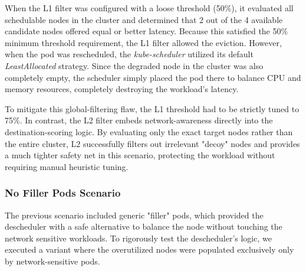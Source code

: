 \begin{table}[H]
    \centering
    \caption{Impact of MinBetterPercentage on L1 Pre-Eviction Filters}
    \label{tab:minbetter_impact}
\end{table}

When the L1 filter was configured with a loose threshold (50\%), it evaluated all schedulable nodes in the cluster and determined that 2 out of the 4 available candidate nodes offered equal or better latency. Because this satisfied the 50\% minimum threshold requirement, the L1 filter allowed the eviction. However, when the pod was rescheduled, the \textit{kube-scheduler} utilized its default \textit{LeastAllocated} strategy. Since the degraded node in the cluster was also completely empty, the scheduler simply placed the pod there to balance CPU and memory resources, completely destroying the workload's latency. 

To mitigate this global-filtering flaw, the L1 threshold had to be strictly tuned to 75\%. In contrast, the L2 filter embeds network-awareness directly into the destination-scoring logic. By evaluating only the exact target nodes rather than the entire cluster, L2 successfully filters out irrelevant "decoy" nodes and provides a much tighter safety net in this scenario, protecting the workload without requiring manual heuristic tuning.

\subsubsection{No Filler Pods Scenario}
\label{subsubsec:netaware4_resultanalysis1_hardtradeoff}
The previous scenario included generic "filler" pods, which provided the descheduler with a safe alternative to balance the node without touching the network sensitive workloads. To rigorously test the descheduler's logic, we executed a variant where the overutilized nodes were populated exclusively only by network-sensitive pods. 

